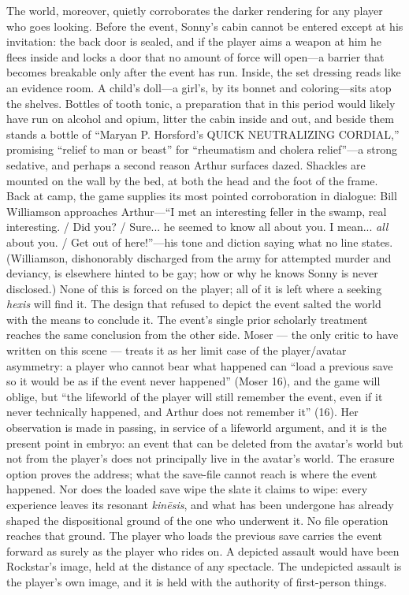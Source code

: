 The world, moreover, quietly corroborates the darker rendering for any player who goes looking. Before the event, Sonny's cabin cannot be entered except at his invitation: the back door is sealed, and if the player aims a weapon at him he flees inside and locks a door that no amount of force will open---a barrier that becomes breakable only after the event has run. Inside, the set dressing reads like an evidence room. A child's doll---a girl's, by its bonnet and coloring---sits atop the shelves. Bottles of tooth tonic, a preparation that in this period would likely have run on alcohol and opium, litter the cabin inside and out, and beside them stands a bottle of ``Maryan P. Horsford's QUICK NEUTRALIZING CORDIAL,'' promising ``relief to man or beast'' for ``rheumatism and cholera relief''---a strong sedative, and perhaps a second reason Arthur surfaces dazed. Shackles are mounted on the wall by the bed, at both the head and the foot of the frame. Back at camp, the game supplies its most pointed corroboration in dialogue: Bill Williamson approaches Arthur---``I met an interesting feller in the swamp, real interesting. / Did you? / Sure... he seemed to know all about you. I mean... \textit{all} about you. / Get out of here!''---his tone and diction saying what no line states. (Williamson, dishonorably discharged from the army for attempted murder and deviancy, is elsewhere hinted to be gay; how or why he knows Sonny is never disclosed.) None of this is forced on the player; all of it is left where a seeking \textit{hexis} will find it. The design that refused to depict the event salted the world with the means to conclude it.
The event's single prior scholarly treatment reaches the same conclusion from the other side. Moser — the only critic to have written on this scene — treats it as her limit case of the player/avatar asymmetry: a player who cannot bear what happened can ``load a previous save so it would be as if the event never happened'' (Moser 16), and the game will oblige, but ``the lifeworld of the player will still remember the event, even if it never technically happened, and Arthur does not remember it'' (16). Her observation is made in passing, in service of a lifeworld argument, and it is the present point in embryo: an event that can be deleted from the avatar's world but not from the player's does not principally live in the avatar's world. The erasure option proves the address; what the save-file cannot reach is where the event happened. Nor does the loaded save wipe the slate it claims to wipe: every experience leaves its resonant \textit{kinēsis}, and what has been undergone has already shaped the dispositional ground of the one who underwent it. No file operation reaches that ground. The player who loads the previous save carries the event forward as surely as the player who rides on. A depicted assault would have been Rockstar's image, held at the distance of any spectacle. The undepicted assault is the player's own image, and it is held with the authority of first-person things.


